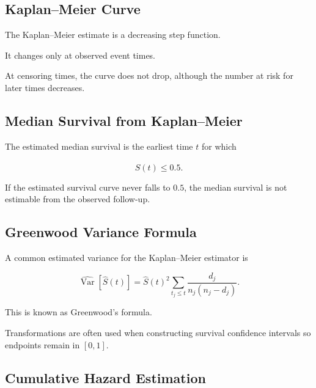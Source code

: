 \subsection{Kaplan--Meier Curve}
\label{subsec:kaplan-meier-curve}

The Kaplan--Meier estimate is a decreasing step function.

It changes only at observed event times.

At censoring times, the curve does not drop, although the number at risk
for later times decreases.

\subsection{Median Survival from Kaplan--Meier}
\label{subsec:km-median-survival}

The estimated median survival is the earliest time \(t\) for which

\[
\boxed{
\widehat{S}(t)
\leq
0.5.
}
\]

If the estimated survival curve never falls to \(0.5\), the median
survival is not estimable from the observed follow-up.

\subsection{Greenwood Variance Formula}
\label{subsec:greenwood-formula}

A common estimated variance for the Kaplan--Meier estimator is

\[
\boxed{
\widehat{\operatorname{Var}}
[
\widehat{S}(t)
]
=
\widehat{S}(t)^2
\sum_{t_j\leq t}
\frac{
d_j
}{
n_j(n_j-d_j)
}.
}
\]

This is known as Greenwood's formula.

Transformations are often used when constructing survival confidence
intervals so endpoints remain in \([0,1]\).

\subsection{Cumulative Hazard Estimation}
\label{subsec:cumulative-hazard-estimation}

